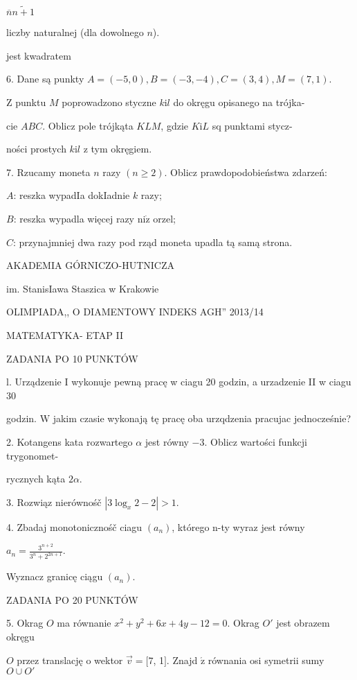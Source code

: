 \documentclass[a4paper,12pt]{article}
\begin{document}
$\overline{n}\tilde{n+1}$

liczby naturalnej (dla dowolnego $n$).

jest kwadratem

6. Dane są punkty $A = (-5,0), B = (-3,-4), C = (3,4), M = (7,1).$

$\mathrm{Z}$ punktu $M$ poprowadzono styczne $k\mathrm{i}l$ do okręgu opisanego na trójka-

cie $ABC$. Oblicz pole trójkąta $KLM$, gdzie $K\mathrm{i}L$ sq punktami stycz-

ności prostych $k\mathrm{i}l$ z tym okręgiem.

7. Rzucamy moneta $n$ razy $(n\geq 2)$. Oblicz prawdopodobieństwa zdarzeń:

$A$: reszka wypadIa dokIadnie $k$ razy;

$B$: reszka wypadla więcej razy $\mathrm{n}\mathrm{i}\dot{\mathrm{z}}$ orzel;

$C$: przynajmniej dwa razy pod rząd moneta upadla tą samą strona.






AKADEMIA GÓRNICZO-HUTNICZA

im. StanisIawa Staszica w Krakowie

OLIMPIADA,, O DIAMENTOWY INDEKS AGH'' 2013/14

MATEMATYKA- ETAP II

ZADANIA PO 10 PUNKTÓW

l. Urządzenie I wykonuje pewną pracę w ciagu 20 godzin, a urzadzenie II w ciagu 30

godzin. $\mathrm{W}$ jakim czasie wykonają tę pracę oba urzqdzenia pracujac jednocześnie?

2. Kotangens kata rozwartego $\alpha$ jest równy $-3$. Oblicz wartości funkcji trygonomet-

rycznych kąta $2\alpha.$

3. Rozwiąz nierównośč $|3\log_{x}2-2|>1.$

4. Zbadaj monotonicznośč ciagu $(a_{n})$, którego n-ty wyraz jest równy

$a_{n}=\displaystyle \frac{3^{n+2}}{3^{n}+2^{2n+1}}.$

Wyznacz granicę ciągu $(a_{n}).$

ZADANIA PO 20 PUNKTÓW

5. Okrag $O$ ma równanie $x^{2}+y^{2}+6x+4y-12=0$. Okrag $O'$ jest obrazem okręgu

$O$ przez translację o wektor $\vec{v}= [7$, 1$].$ Znajd $\acute{\mathrm{z}}$ równania osi symetrii sumy $O\cup O'$
\end{document}
